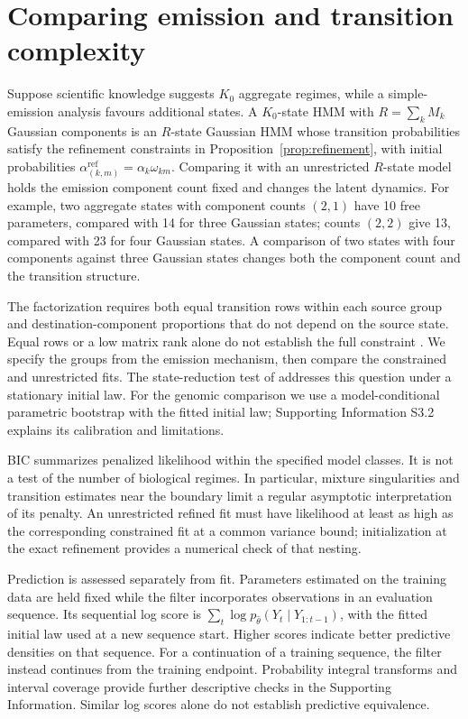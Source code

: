 \documentclass[11pt]{article}
\theoremstyle{definition}
\begin{document}
\section{Comparing emission and transition complexity}\label{sec:workflow}

Suppose scientific knowledge suggests $K_0$ aggregate regimes, while a
simple-emission analysis favours additional states. A $K_0$-state HMM with
$R=\sum_k M_k$ Gaussian components is an $R$-state Gaussian HMM whose
transition probabilities satisfy the refinement constraints in
Proposition~\ref{prop:refinement}, with initial probabilities
$\alpha^{\mathrm{ref}}_{(k,m)}=\alpha_k\omega_{km}$. Comparing it with an unrestricted
$R$-state model holds the emission component count fixed and changes the
latent dynamics. For example, two aggregate states with component counts
$(2,1)$ have 10 free parameters, compared with 14 for three Gaussian states;
counts $(2,2)$ give 13, compared with 23 for four Gaussian states. A comparison
of two states with four components against three Gaussian states changes both
the component count and the transition structure.

The factorization requires both equal transition rows within each source
group and destination-component proportions that do not depend on the source
state. Equal rows or a low matrix rank alone do not establish the full
constraint \citep{HolzmannSchwaiger2015}. We specify the groups from the
emission mechanism, then compare the constrained and unrestricted fits.
The state-reduction test of \citet{HolzmannSchwaiger2015} addresses this
question under a stationary initial law. For the genomic comparison we
use a model-conditional parametric bootstrap with the fitted initial law;
Supporting Information S3.2 explains its calibration and limitations.

BIC summarizes penalized likelihood within the specified model classes.
It is not a test of the number of biological regimes. In particular, mixture
singularities and transition estimates near the boundary limit a regular
asymptotic interpretation of its penalty. An unrestricted refined fit must
have likelihood at least as high as the corresponding constrained fit at a
common variance bound; initialization at the exact refinement provides a
numerical check of that nesting.

Prediction is assessed separately from fit. Parameters estimated on the
training data are held fixed while the filter incorporates observations in
an evaluation sequence. Its sequential log score is
$\sum_t\log p_{\widehat\theta}(Y_t\mid Y_{1:t-1})$, with the fitted initial
law used at a new sequence start. Higher scores indicate better predictive
densities on that sequence. For a continuation of a training sequence, the
filter instead continues from the training endpoint. Probability integral
transforms and interval coverage provide further descriptive checks in the
Supporting Information. Similar log scores alone do not establish predictive
equivalence.
\end{document}
